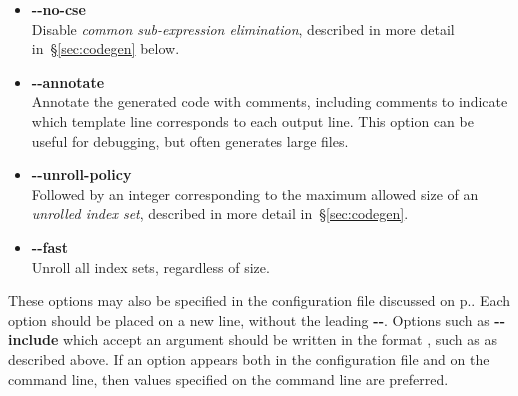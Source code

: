 \documentclass[11pt,a4paper]{article}
\renewcommand{\texttt}[1]{{\ttfamily\fontseries{l}\selectfont{#1}}}
\newcommand{\file}[1]{\texttt{{#1}}}
\newcommand{\option}[1]{{\ttfamily\bfseries\small #1}}
\begin{document}
\begin{itemize}
    \item \option{{-}{-}no-cse} \\
    Disable \emph{common sub-expression elimination}, described in more detail
    in~\S\ref{sec:codegen} below.
    
    \item \option{{-}{-}annotate} \\
    Annotate the generated code with comments,
    including comments to indicate which
    template line corresponds to each output line.
    This option can be useful for debugging, but often generates large
    files.
    
    \item \option{{-}{-}unroll-policy} \\
    Followed by an integer corresponding to the maximum allowed size of an
    \emph{unrolled index set}, described in more detail in~\S\ref{sec:codegen}.
    
    \item \option{{-}{-}fast} \\
    Unroll all index sets, regardless of size.
\end{itemize}

These options may also be specified in the
\file{\textasciitilde{}/.cpptransport} configuration
file discussed on p.\pageref{page:config-files}.
Each option should be placed on a new line,
without the leading \option{{-}{-}}.
Options such as \option{{-}{-}include} which accept an argument
should be written in the format
\texttt{option = argument},
such as
\texttt{include = /usr/local/share/cpptransport}
as described above.
If an option appears both in the configuration file and on the
command line, then values specified on the command line
are preferred.
\end{document}
